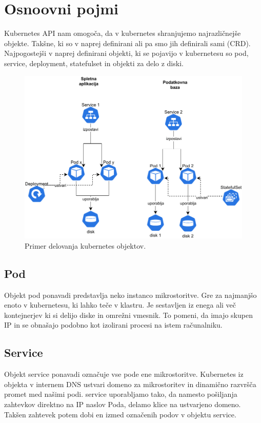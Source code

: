 \documentclass[a4paper, 12pt]{book}
\begin{document}
\section{Osnoovni pojmi}
Kubernetes API nam omogoča, da v kubernetes shranjujemo najrazličnejše objekte.
Takšne, ki so v naprej definirani ali pa smo jih definirali sami (CRD).
Najpogostejši v naprej definirani objekti, ki se pojavijo v kubernetesu so pod, service, deployment, statefulset in objekti za delo z diski.
\begin{figure}[h]
\begin{center}
\includegraphics[width=1.0\textwidth]{images/kubernetes-simple-schema.pdf}
\end{center}
\caption{Primer delovanja kubernetes objektov.}
\label{problem-povezanih-klastrov}
\end{figure}
\subsection{Pod~\cite{pod}}
Objekt pod ponavadi predstavlja neko instanco mikrostoritve.
Gre za najmanjšo enoto v kubernetesu, ki lahko teče v klastru.
Je sestavljen iz enega ali več kontejnerjev ki si delijo diske in omrežni vmesnik.
To pomeni, da imajo skupen IP in se obnašajo podobno kot izolirani procesi na istem računalniku.
\subsection{Service~\cite{service}}
Objekt service ponavadi označuje vse pode ene mikrostoritve.
Kubernetes iz objekta v internem DNS ustvari domeno za mikrostoritev in dinamično razvršča promet med našimi podi.
service uporabljamo tako, da namesto pošiljanja zahtevkov direktno na IP naslov Poda, delamo klice na ustvarjeno domeno.
Takšen zahtevek potem dobi en izmed označenih podov v objektu service.
\end{document}

